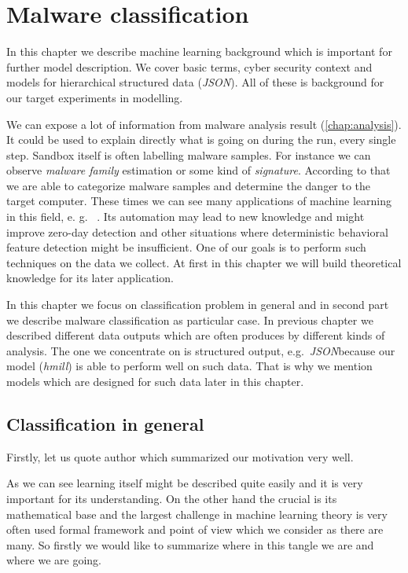 \chapter{Malware classification} \label{chap:classification}
In this chapter we describe machine learning background which is important for further model description. We cover basic terms, cyber security context and models for hierarchical structured data (\emph{JSON}). All of these is background for our target experiments in modelling.


We can expose a lot of information from malware analysis result (\ref{chap:analysis}). It could be used to explain directly what is going on during the run, every single step. Sandbox itself is often labelling malware samples. For instance we can observe \emph{malware family} estimation or some kind of \emph{signature}. According to that we are able to categorize malware samples and determine the danger to the target computer. These times we can see many applications of machine learning in this field, e. g. \ \cite{Yen2019}. Its automation may lead to new knowledge and might improve zero-day detection and other situations where deterministic behavioral feature detection might be insufficient. One of our goals is to perform such techniques on the data we collect. At first in this chapter we will build theoretical knowledge for its later application.

In this chapter we focus on classification problem in general and in second part we describe malware classification as particular case. In previous chapter we described different data outputs which are often produces by different kinds of analysis. The one we concentrate on is structured output, e.g.\ \emph{JSON}because our model (\emph{hmill}) is able to perform well on such data. That is why we mention models which are designed for such data later in this chapter.

\section{Classification in general}
Firstly, let us quote author which summarized our motivation very well.

 \cite{Russell2009}

As we can see learning itself might be described quite easily and it is very important for its understanding. On the other hand the crucial is its mathematical base and the largest challenge in machine learning theory is very often used formal framework and point of view which we consider as there are many. So firstly we would like to summarize where in this tangle we are and where we are going.


